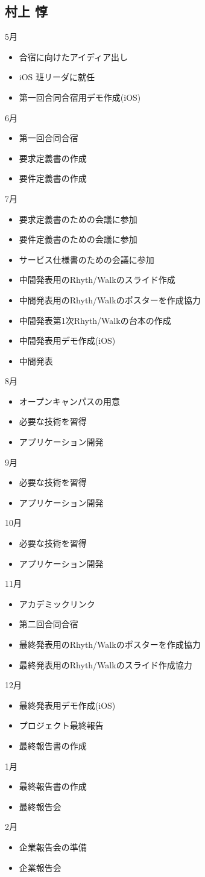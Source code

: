 \subsection{村上 惇}
5月
\begin{itemize}
\item 合宿に向けたアイディア出し
\item iOS 班リーダに就任
\item 第一回合同合宿用デモ作成(iOS)
\end{itemize}
6月
\begin{itemize}
\item 第一回合同合宿
\item 要求定義書の作成		　
\item 要件定義書の作成
\end{itemize}
7月
\begin{itemize}
\item 要求定義書のための会議に参加
\item 要件定義書のための会議に参加
\item サービス仕様書のための会議に参加
\item 中間発表用のRhyth/Walkのスライド作成
\item 中間発表用のRhyth/Walkのポスターを作成協力
\item 中間発表第1次Rhyth/Walkの台本の作成
\item 中間発表用デモ作成(iOS)
\item 中間発表
\end{itemize}
8月
\begin{itemize}
\item オープンキャンパスの用意
\item 必要な技術を習得
\item アプリケーション開発
\end{itemize}
9月 
\begin{itemize}
\item 必要な技術を習得
\item アプリケーション開発
\end{itemize}
10月
\begin{itemize}
\item 必要な技術を習得
\item アプリケーション開発
\end{itemize}
11月
\begin{itemize}
\item アカデミックリンク
\item 第二回合同合宿
\item 最終発表用のRhyth/Walkのポスターを作成協力
\item 最終発表用のRhyth/Walkのスライド作成協力
\end{itemize}
12月
\begin{itemize}
\item 最終発表用デモ作成(iOS)
\item プロジェクト最終報告
\item 最終報告書の作成
\end{itemize}
1月
\begin{itemize}
\item 最終報告書の作成
\item 最終報告会
\end{itemize}
2月
\begin{itemize}
\item 企業報告会の準備
\item 企業報告会
\end{itemize}


